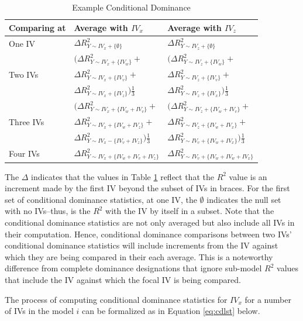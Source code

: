 \documentclass[ShortAfour,times,sageapa]{sagej}
\begin{document}
	\begin{table}[h!]
		\centering
		\caption{\centering Example Conditional Dominance}
		\begin{tabular}{ l | l l }
			Comparing at & Average with $IV_x$ & Average with $IV_z$ \\
			\hline
			One IV & $\Delta R^2_{Y \sim IV_x + \{\emptyset\}}$ & $\Delta R^2_{Y \sim IV_z + \{\emptyset\}}$ \\
			\hline
			& $(\Delta R^2_{Y \sim IV_x + \{IV_w\}} + $ & $(\Delta R^2_{Y \sim IV_z + \{IV_w\}} + $ \\
			Two IVs & $\Delta R^2_{Y \sim IV_x + \{IV_v\}} + $ & $\Delta R^2_{Y \sim IV_z + \{IV_v\}} + $ \\
			& $\Delta R^2_{Y \sim IV_x + \{IV_z\}})\frac{1}{3}$ & $\Delta R^2_{Y \sim IV_z + \{IV_x\}})\frac{1}{3} $ \\
			\hline
			& $(\Delta R^2_{Y \sim IV_x + \{IV_w + IV_v\}} + $ & $(\Delta R^2_{Y \sim IV_z + \{IV_w + IV_v\}} + $ \\
			Three IVs & $\Delta R^2_{Y \sim IV_x + \{IV_w + IV_z\}} + $ & $\Delta R^2_{Y \sim IV_z + \{IV_w + IV_x\}} + $ \\
			& $\Delta R^2_{Y \sim IV_x - \{IV_v + IV_z\}})\frac{1}{3}$ & $\Delta R^2_{Y \sim IV_v + \{IV_w + IV_x\}})\frac{1}{3}$ \\
			\hline
			Four IVs & $\Delta R^2_{Y \sim IV_x + \{IV_w + IV_v + IV_z\}}$ & $\Delta R^2_{Y \sim IV_v + \{IV_w + IV_w + IV_x\}}$ \\
			\hline
		\end{tabular}
		\label{tab:excdl}
	\end{table}
	
	The $\Delta$ indicates that the values in Table \ref{tab:excdl} reflect that the $R^2$ value is an increment made by the first IV beyond the subset of IVs in braces.
	For the first set of conditional dominance statistics, at one IV, the $\emptyset$ indicates the null set with no IVs--thus, is the $R^2$ with the IV by itself in a subset.
	Note that the conditional dominance statistics are not only averaged but also include all IVs in their computation.
	Hence, conditional dominance comparisons between two IVs' conditional dominance statistics will include increments from the IV against which they are being compared in their each average.
	This is a noteworthy difference from complete dominance designations that ignore sub-model $R^2$ values that include the IV against which the focal IV is being compared.
	
	The process of computing conditional dominance statistics for $IV_x$ for a number of IVs in the model $i$ can be formalized as in Equation \ref{eq:cdlst} below.
	
\end{document}
